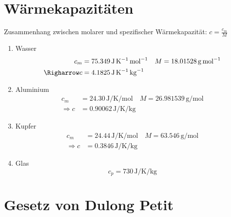 \documentclass[a4paper]{article}
\begin{document}
\section{Wärmekapazitäten}
Zusammenhang zwischen molarer und spezifischer Wärmekapazität: 
$c = \frac{c_m}{M}$
\begin{enumerate}
	\item Wasser \cite{janaf}
		\begin{align*}
			c_m &= 75.349 \, \si{\joule\per\kelvin\per\mol}
			\quad
			M = 18.01528 \, \si{\gram\per\mol} 
			\\
			\Righarrow c &= 4.1825 \, \si{\joule\per\kelvin\per\kg}
		\end{align*}
	\item Aluminium \cite[16]{handbuch}
		\begin{align*}
			c_m &= 24.30 \, \si{\joule\per\kelvin\per\mol}
			\quad
			M = 26.981539 \, \si{\gram\per\mol} 
			\\
			\Rightarrow c &= 0.90062 \, \si{\joule\per\kelvin\per\kg}
		\end{align*}
	\item Kupfer \cite[133f]{handbuch}
		\begin{align*}
			c_m &= 24.44 \, \si{\joule\per\kelvin\per\mol}
			\quad
			M = 63.546 \, \si{\gram\per\mol} 
			\\
			\Rightarrow c &= 0.3846 \, \si{\joule\per\kelvin\per\kg}
		\end{align*}
	\item Glas \cite[944f]{handbuch} 
		\[
			c_p = 730 \,\si{\joule\per\kelvin\per\kg}
		\]
\end{enumerate}

\section{Gesetz von Dulong Petit}

\printbibliography
\end{document}

